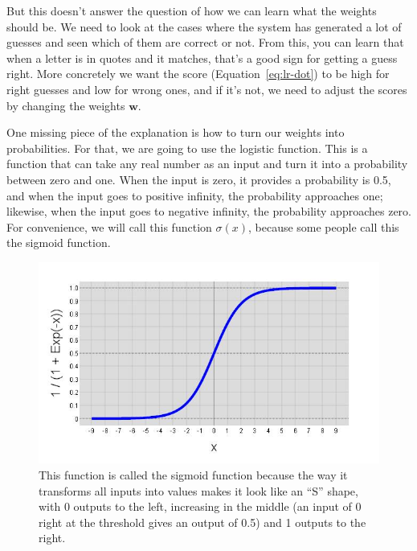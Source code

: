 But this doesn't answer the question of how we can learn what the weights
should be.
%
We need to look at the cases where the system has generated a lot of guesses
and seen which of them are correct or not.
%
From this, you can learn that when
a letter is in quotes and it matches, that’s a good sign for getting a guess right.
%
More concretely we want the score (Equation~\ref{eq:lr-dot}) to be high for
right guesses and low for wrong ones, and if it's not, we need to adjust the
scores by changing the weights ${\bm w}$.

One missing piece of the explanation is how to turn our weights into
probabilities.
%
For that, we are going to use the logistic function.
%
This is a function that can take any real number as an input and turn it into
a probability between zero and one.
%
When the input is zero, it provides a probability is 0.5, and when the input
goes to positive infinity, the probability approaches one; likewise, when the
input goes to negative infinity, the probability approaches zero.
%
For convenience, we will call this function $\sigma(x)$, because some people
call this the sigmoid function.

\begin{figure}
  \begin{center}
    \includegraphics[width=0.5\linewidth]{figures/plots/sigmoid}
    \end{center}
\caption{This function is
  called the sigmoid function because the way it transforms all inputs into
  values makes it look like an ``S'' shape, with 0 outputs to the left,
  increasing in the middle (an input of 0 right at the threshold gives an
  output of 0.5) and 1 outputs to the right.}
\label{fig:watson:sigmoid}
\end{figure}

